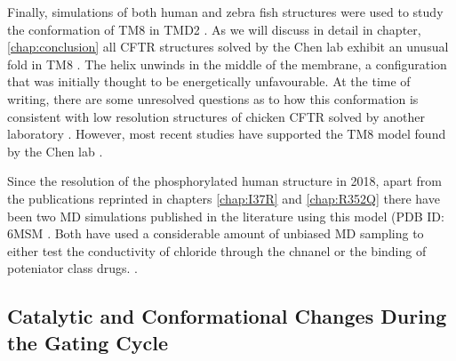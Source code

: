 Finally, simulations of both human and zebra fish structures were used to study the conformation of TM8 in TMD2 \cite{corradi2018}. As we will discuss in detail in chapter, \ref{chap:conclusion} all CFTR structures solved by the Chen lab exhibit an unusual fold in TM8 \cite{fiedorczuk2021, liu2017, liu2019, zhang2016, zhang2018a, zhang2017a}. The helix unwinds in the middle of the membrane, a configuration that was initially thought to be energetically unfavourable. At the time of writing, there are some unresolved questions as to how this conformation is consistent with low resolution structures of chicken CFTR solved by another laboratory \cite{fay2018}. However, most recent studies have supported the TM8 model found by the Chen lab \cite{corradi2018, negoda2019}. 

Since the resolution of the phosphorylated human structure in 2018, apart from the publications reprinted in chapters \ref{chap:I37R} and \ref{chap:R352Q} there have been two MD simulations published in the literature using this model (PDB ID: 6MSM \cite{zhang2018a}. Both have used a considerable amount of unbiased MD sampling to either test the conductivity of chloride through the chnanel or the binding of poteniator class drugs. .



\subsection{Catalytic and Conformational Changes During the Gating Cycle}

